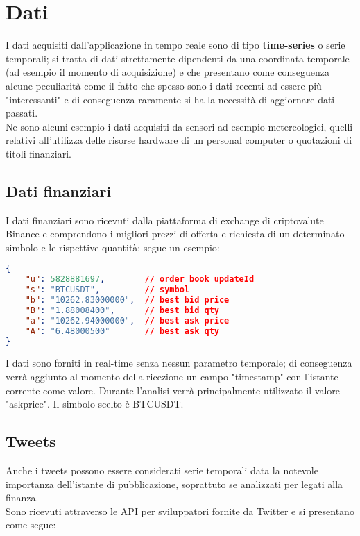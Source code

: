 \section{Dati}

I dati acquisiti dall'applicazione in tempo reale sono di tipo \textbf{time-series} o serie
temporali; si tratta di dati strettamente dipendenti da una coordinata temporale (ad esempio
il momento di acquisizione) e che presentano come conseguenza alcune peculiarità come il fatto
che spesso sono i dati recenti ad essere più "interessanti" e di conseguenza raramente si ha
la necessità di aggiornare dati passati.
\\
Ne sono alcuni esempio i dati acquisiti da sensori ad esempio metereologici, quelli relativi
all'utilizza delle risorse hardware di un personal computer o quotazioni di titoli finanziari.

\subsection{Dati finanziari}

I dati finanziari sono ricevuti dalla piattaforma di exchange di criptovalute Binance \cite{binance}
e comprendono i migliori prezzi di offerta e richiesta di un determinato simbolo e le rispettive
quantità; segue un esempio:

\begin{lstlisting}[language=json,firstnumber=1]
{
    "u": 5828881697,        // order book updateId
    "s": "BTCUSDT",         // symbol
    "b": "10262.83000000",  // best bid price
    "B": "1.88008400",      // best bid qty
    "a": "10262.94000000",  // best ask price
    "A": "6.48000500"       // best ask qty
}
\end{lstlisting}
%
I dati sono forniti in real-time senza nessun parametro temporale; di conseguenza verrà
aggiunto al momento della ricezione un campo "timestamp" con l'istante corrente come valore.
Durante l'analisi verrà principalmente utilizzato il valore "askprice".
Il simbolo scelto è BTCUSDT.

\subsection{Tweets}

Anche i tweets possono essere considerati serie temporali data la notevole importanza
dell'istante di pubblicazione, soprattuto se analizzati per legati alla finanza.
\\
Sono ricevuti attraverso le API per sviluppatori fornite da Twitter \cite{twitter} e si
presentano come segue:

